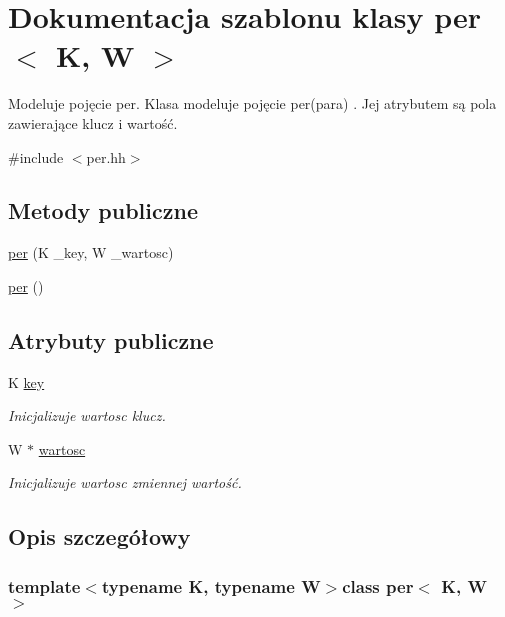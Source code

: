 \hypertarget{classper}{\section{Dokumentacja szablonu klasy per$<$ K, W $>$}
\label{classper}
}


Modeluje pojęcie per. Klasa modeluje pojęcie per(para) . Jej atrybutem są pola zawierające klucz i wartość.  




{\ttfamily \#include $<$per.\-hh$>$}

\subsection*{Metody publiczne}
\begin{DoxyCompactItemize}
\item 
\hyperlink{classper_a73013b168f465e358ce0371a730a0bfa}{per} (K \-\_\-key, W \-\_\-wartosc)
\item 
\hyperlink{classper_a15a9c5b538d2c25c8b2492f0acfbba89}{per} ()
\end{DoxyCompactItemize}
\subsection*{Atrybuty publiczne}
\begin{DoxyCompactItemize}
\item 
K \hyperlink{classper_a33ecddc68cd15fc35c4f7487b4f2705d}{key}
\begin{DoxyCompactList}\small\item\em Inicjalizuje wartosc klucz. \end{DoxyCompactList}\item 
W $\ast$ \hyperlink{classper_a226a74072ab3ff12f6c31e27190762a0}{wartosc}
\begin{DoxyCompactList}\small\item\em Inicjalizuje wartosc zmiennej wartość. \end{DoxyCompactList}\end{DoxyCompactItemize}


\subsection{Opis szczegółowy}
\subsubsection*{template$<$typename K, typename W$>$class per$<$ K, W $>$}




